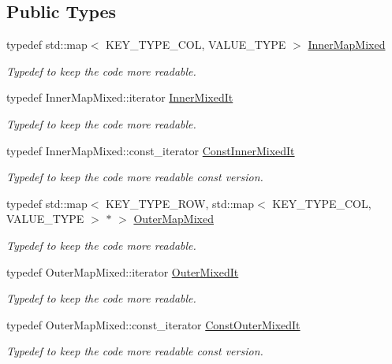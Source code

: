 \subsection*{Public Types}
\begin{DoxyCompactItemize}
\item 
typedef std\+::map$<$ K\+E\+Y\+\_\+\+T\+Y\+P\+E\+\_\+\+C\+OL, V\+A\+L\+U\+E\+\_\+\+T\+Y\+PE $>$ \hyperlink{classoomph_1_1MapMatrixMixed_aed39c3f0e6377a36ea7653c6de21b0ce}{Inner\+Map\+Mixed}
\begin{DoxyCompactList}\small\item\em Typedef to keep the code more readable. \end{DoxyCompactList}\item 
typedef Inner\+Map\+Mixed\+::iterator \hyperlink{classoomph_1_1MapMatrixMixed_a88516855a59e81851521a52d5355e9c9}{Inner\+Mixed\+It}
\begin{DoxyCompactList}\small\item\em Typedef to keep the code more readable. \end{DoxyCompactList}\item 
typedef Inner\+Map\+Mixed\+::const\+\_\+iterator \hyperlink{classoomph_1_1MapMatrixMixed_a0599160ea5bf25e9666f6825af3ed480}{Const\+Inner\+Mixed\+It}
\begin{DoxyCompactList}\small\item\em Typedef to keep the code more readable const version. \end{DoxyCompactList}\item 
typedef std\+::map$<$ K\+E\+Y\+\_\+\+T\+Y\+P\+E\+\_\+\+R\+OW, std\+::map$<$ K\+E\+Y\+\_\+\+T\+Y\+P\+E\+\_\+\+C\+OL, V\+A\+L\+U\+E\+\_\+\+T\+Y\+PE $>$ $\ast$ $>$ \hyperlink{classoomph_1_1MapMatrixMixed_accfdbc5eed007b560e52b4ce77c11680}{Outer\+Map\+Mixed}
\begin{DoxyCompactList}\small\item\em Typedef to keep the code more readable. \end{DoxyCompactList}\item 
typedef Outer\+Map\+Mixed\+::iterator \hyperlink{classoomph_1_1MapMatrixMixed_ae9b361be3e0ce68e8f6618b95cbad231}{Outer\+Mixed\+It}
\begin{DoxyCompactList}\small\item\em Typedef to keep the code more readable. \end{DoxyCompactList}\item 
typedef Outer\+Map\+Mixed\+::const\+\_\+iterator \hyperlink{classoomph_1_1MapMatrixMixed_aae407586fb40aaf48fd20a0678adb591}{Const\+Outer\+Mixed\+It}
\begin{DoxyCompactList}\small\item\em Typedef to keep the code more readable const version. \end{DoxyCompactList}\end{DoxyCompactItemize}

